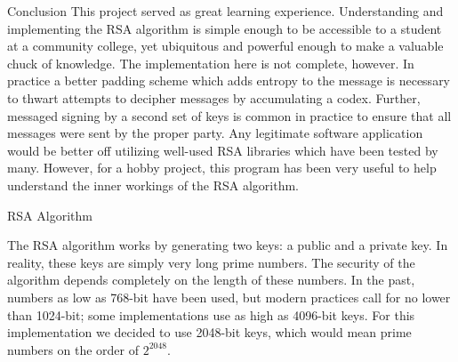 \documentclass[landscape,a0paper,fontscale=.46]{baposter} %
\begin{document}
\begin{poster}
\begin{posterbox}[name=conclusion, column=3, below=code]{Conclusion} 
This project served as great learning experience. Understanding and implementing the RSA algorithm is simple enough to be accessible to a student at a community college, yet ubiquitous and powerful enough to make a valuable chuck of knowledge. The implementation here is not complete, however. In practice a better padding scheme which adds entropy to the message is necessary to thwart attempts to decipher messages by accumulating a codex. Further, messaged signing by a second set of keys is common in practice to ensure that all messages were sent by the proper party. Any legitimate software application would be better off utilizing well-used RSA libraries which have been tested by many. However, for a hobby project, this program has been very useful to help understand the inner workings of the RSA algorithm.
\end{posterbox}





\begin{posterbox}[name=rsa,column=1,row=0,span=2]{RSA Algorithm} %

The RSA algorithm works by generating two keys: a public and a private key. In reality, these keys are simply very long prime numbers. The security of the algorithm depends completely on the length of these numbers. In the past, numbers as low as 768-bit have been used, but modern practices call for no lower than 1024-bit; some implementations use as high as 4096-bit keys. For this implementation we decided to use 2048-bit keys, which would mean prime numbers on the order of $2^{2048}$.


\end{posterbox}
\end{poster}
\end{document}
